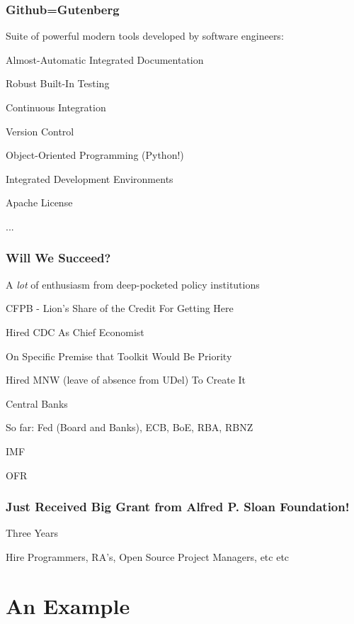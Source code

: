 \documentclass[public]{beamer}
\begin{document}
\begin{frame}\frametitle{Github=Gutenberg}
\pause Suite of powerful modern tools developed by software engineers: \pause    
    \bi
  \item Almost-Automatic Integrated Documentation
  \item Robust Built-In Testing 
  \item Continuous Integration
  \item Version Control
  \item Object-Oriented Programming (Python!)
  \item Integrated Development Environments
  \item Apache License 
  \item ...
    \ei
    \medskip

  \end{frame}

  

\begin{frame}\frametitle{Will We Succeed?}  
\pause A {\it lot} of enthusiasm from deep-pocketed policy institutions     \pause

\bi \item CFPB - Lion's Share of the Credit For Getting Here
  \bi
\item Hired CDC As Chief Economist
  \bi
  \item On Specific Premise that Toolkit Would Be Priority
    \ei
    \item Hired MNW (leave of absence from UDel) To Create It 
  \ei
  \ei
  
    \bi
  \item Central Banks
    \bi \item So far: Fed (Board and Banks), ECB, BoE, RBA, RBNZ
    \ei 
  \item IMF
  \item OFR
    \ei
    
\end{frame}

\begin{frame}\frametitle{Just Received Big Grant from Alfred P. Sloan Foundation!}  

  Three Years \pause
  \bi
  \item Hire Programmers, RA's, Open Source Project Managers, etc etc
  \ei
  
\end{frame}

\section{An Example}
\end{document}
